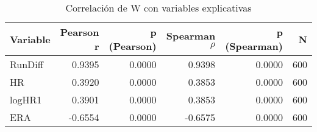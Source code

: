 \begin{table}[H]
    \centering
    \caption{Correlación de W con variables explicativas}
    \label{tab:corr_w_x}
    \begin{tabular}{lrrrrr}
    \toprule
    Variable & Pearson r & p (Pearson) & Spearman $\rho$ & p (Spearman) & N \\
    \midrule
    RunDiff & 0.9395 & 0.0000 & 0.9398 & 0.0000 & 600 \\
    HR & 0.3920 & 0.0000 & 0.3853 & 0.0000 & 600 \\
    logHR1 & 0.3901 & 0.0000 & 0.3853 & 0.0000 & 600 \\
    ERA & -0.6554 & 0.0000 & -0.6575 & 0.0000 & 600 \\
    \bottomrule
    \end{tabular}
\end{table}
